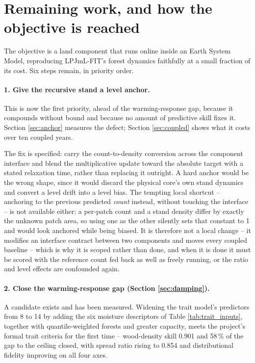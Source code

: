 \documentclass[11pt]{article}
\begin{document}
\section{Remaining work, and how the objective is reached}
\label{sec:roadmap}

The objective is a land component that runs online inside an Earth System Model, reproducing LPJmL-FIT's forest dynamics faithfully at a small fraction of its cost. Six steps remain, in priority order.

\paragraph{1. Give the recursive stand a level anchor.}
This is now the first priority, ahead of the warming-response gap, because it compounds without bound and because no amount of predictive skill fixes it. Section \ref{sec:anchor} measures the defect; Section \ref{sec:coupled} shows what it costs over ten coupled years.

The fix is specified: carry the count-to-density conversion across the component interface and blend the multiplicative update toward the absolute target with a stated relaxation time, rather than replacing it outright. A hard anchor would be the wrong shape, since it would discard the physical core's own stand dynamics and convert a level drift into a level bias. The tempting local shortcut -- anchoring to the previous predicted \emph{count} instead, without touching the interface -- is not available either: a per-patch count and a stand density differ by exactly the unknown patch area, so using one as the other silently sets that constant to 1 and would look anchored while being biased. It is therefore not a local change -- it modifies an interface contract between two components and moves every coupled baseline -- which is why it is scoped rather than done, and when it is done it must be scored with the reference count fed back as well as freely running, or the ratio and level effects are confounded again.

\paragraph{2. Close the warming-response gap (Section \ref{sec:damping}).}
A candidate exists and has been measured. Widening the trait model's predictors from 8 to 14 by adding the six moisture descriptors of Table \ref{tab:trait_inputs}, together with quantile-weighted forests and greater capacity, meets the project's formal trait criteria for the first time -- wood-density skill 0.901 and 58\,\% of the gap to the ceiling closed, with spread ratio rising to 0.854 and distributional fidelity improving on all four axes.
\end{document}
